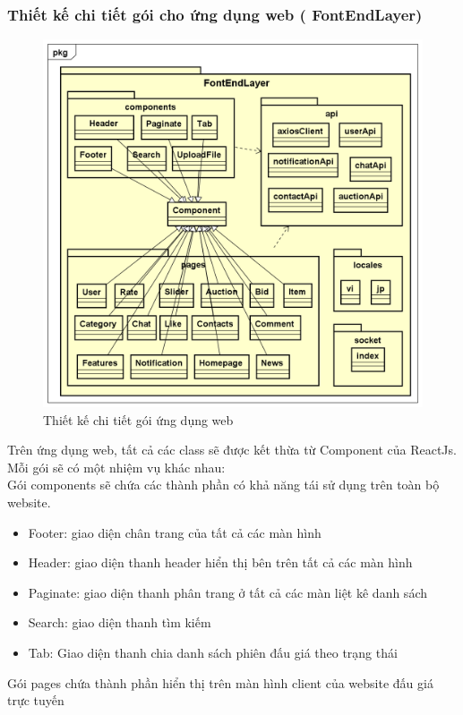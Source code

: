 \documentclass[../DoAn.tex]{subfiles}
\begin{document}
\subsubsection{Thiết kế chi tiết gói cho ứng dụng web ( FontEndLayer)
} \mbox{}
\begin{figure}[H]
    \centering
    \includegraphics[width=0.75\linewidth,height=10.87cm]{Hinhve/FontEndLayer752.png}
    \caption{Thiết kế chi tiết gói ứng dụng web}
    \label{fig:Fig44}
\end{figure}
Trên ứng dụng web, tất cả các class sẽ được kết thừa từ Component của ReactJs.\\
Mỗi gói sẽ có một nhiệm vụ khác nhau: \\
Gói components sẽ chứa các thành phần có khả năng tái sử dụng trên toàn bộ website.
\begin{itemize}
    \item Footer: giao diện chân trang của tất cả các màn hình
    \item Header: giao diện thanh header hiển thị bên trên tất cả các màn hình
    \item Paginate: giao diện thanh phân trang ở tất cả các màn liệt kê danh sách
    \item Search: giao diện thanh tìm kiếm
    \item Tab: Giao diện thanh chia danh sách phiên đấu giá theo trạng thái
\end{itemize}
Gói pages chứa thành phần hiển thị trên màn hình client của website đấu giá trực tuyến
\end{document}
